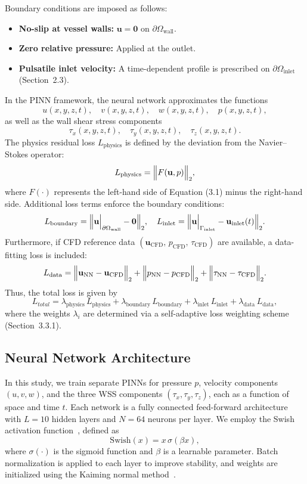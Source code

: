 \documentclass[12pt, a4paper]{article}
\begin{document}
Boundary conditions are imposed as follows:
\begin{itemize}
    \item \textbf{No-slip at vessel walls:} \(\mathbf{u} = \mathbf{0}\) on \(\partial\Omega_{\text{wall}}\).
    \item \textbf{Zero relative pressure:} Applied at the outlet.
    \item \textbf{Pulsatile inlet velocity:} A time-dependent profile is prescribed on \(\partial\Omega_{\text{inlet}}\) (Section~2.3).
\end{itemize}
In the PINN framework, the neural network approximates the functions
\[
u(x,y,z,t),\quad v(x,y,z,t),\quad w(x,y,z,t),\quad p(x,y,z,t),
\]
as well as the wall shear stress components
\[
\tau_x(x,y,z,t),\quad \tau_y(x,y,z,t),\quad \tau_z(x,y,z,t).
\]
The physics residual loss $L_{\mathrm{physics}}$ is defined by the deviation from the Navier--Stokes operator:
\[
L_{\mathrm{physics}} = \Bigl\|F(\mathbf{u},p)\Bigr\|_2,
\]
where $F(\cdot)$ represents the left-hand side of Equation (3.1) minus the right-hand side. Additional loss terms enforce the boundary conditions:
\[
L_{\mathrm{boundary}} = \Bigl\|\mathbf{u}\Big|_{\partial\Omega_{\text{wall}}} - \mathbf{0}\Bigr\|_2, \quad
L_{\mathrm{inlet}} = \Bigl\|\mathbf{u}\Big|_{\Gamma_{\mathrm{inlet}}} - \mathbf{u}_{\mathrm{inlet}}(t)\Bigr\|_2.
\]
Furthermore, if CFD reference data $(\mathbf{u}_{\mathrm{CFD}},\,p_{\mathrm{CFD}},\,\tau_{\mathrm{CFD}})$ are available, a data-fitting loss is included:
\[
L_{\mathrm{data}} = \Bigl\|\mathbf{u}_{\mathrm{NN}} - \mathbf{u}_{\mathrm{CFD}}\Bigr\|_2 + \Bigl\|p_{\mathrm{NN}} - p_{\mathrm{CFD}}\Bigr\|_2 + \Bigl\|\tau_{\mathrm{NN}} - \tau_{\mathrm{CFD}}\Bigr\|_2.
\]
Thus, the total loss is given by
\begin{equation}
L_{total} = \lambda_{\mathrm{physics}}\,L_{\mathrm{physics}} + \lambda_{\mathrm{boundary}}\,L_{\mathrm{boundary}} + \lambda_{\mathrm{inlet}}\,L_{\mathrm{inlet}} + \lambda_{\mathrm{data}}\,L_{\mathrm{data}},
\label{eq:total_loss}
\end{equation}
where the weights $\lambda_i$ are determined via a self-adaptive loss weighting scheme (Section~3.3.1).

\subsection{Neural Network Architecture}
\label{sec:PINN_Architecture_Training}
In this study, we train separate PINNs for pressure $p$, velocity components $(u,v,w)$, and the three WSS components $(\tau_x,\tau_y,\tau_z)$, each as a function of space and time $t$. Each network is a fully connected feed-forward architecture with $L=10$ hidden layers and $N=64$ neurons per layer. We employ the Swish activation function~\citep{ramachandran2017searching}, defined as
\[
\mathrm{Swish}(x) = x\,\sigma(\beta x),
\]
where $\sigma(\cdot)$ is the sigmoid function and $\beta$ is a learnable parameter. Batch normalization is applied to each layer to improve stability, and weights are initialized using the Kaiming normal method~\citep{he2015delving}.
\end{document}
